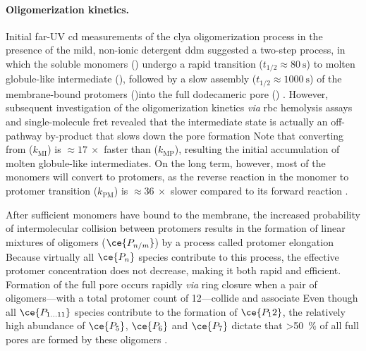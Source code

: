 \paragraph{Oligomerization kinetics.}
%
Initial far-UV \gls{cd} measurements of the \gls{clya} oligomerization process in the presence of the mild,
non-ionic detergent \gls{ddm} suggested a two-step process, in which the soluble monomers () undergo a
rapid transition ($t_{1/2} \approx \SI{80}{\second}$) to molten globule-like intermediate (), followed
by a slow assembly  ($t_{1/2} \approx \SI{1000}{\second}$) of the membrane-bound protomers ()into the
full dodecameric pore () \cite{Eifler-2006}. However, subsequent investigation of the oligomerization
kinetics \textit{via} \gls{rbc} hemolysis assays \cite{Vaidyanathan-2014} and single-molecule
\gls{fret} \cite{Benke-2015} revealed that the intermediate state is actually an off-pathway by-product that
slows down the pore formation \cite{Roderer-2017}
%
%
Note that converting from  ($k_{\text{MI}}$) is $\approx17~\times$ faster than 
($k_{\text{MP}}$), resulting the initial accumulation of molten globule-like intermediates. On the long term,
however, most of the monomers will convert to protomers, as the reverse reaction in the monomer to protomer
transition  ($k_{\text{PM}}$) is $\approx36~\times$ slower compared to its forward reaction
.

After sufficient monomers have bound to the membrane, the increased probability of intermolecular collision
between protomers results in the formation of linear mixtures of oligomers ($\ce{P_{n/m}}$) by a process
called protomer elongation \cite{Roderer-2017}
%
%
Because virtually all $\ce{P_n}$ species contribute to this process, the effective protomer concentration does
not decrease, making it both rapid and efficient. Formation of the full pore occurs rapidly \textit{via} ring
closure when a pair of oligomers---with a total protomer count of 12---collide and associate
%
%
Even though all $\ce{P_{1\ldots11}}$ species contribute to the formation of $\ce{P_12}$, the relatively high
abundance of $\ce{P_5}$, $\ce{P_6}$ and $\ce{P_7}$ dictate that \SI{>50}{\percent} of all full pores are
formed by these oligomers \cite{Benke-2015}.




